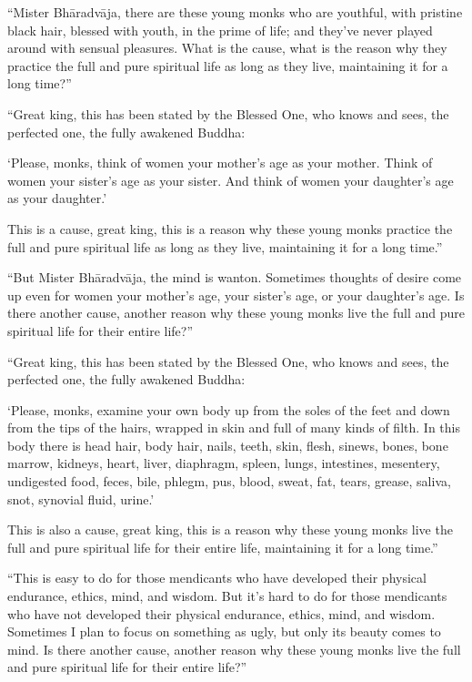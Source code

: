 \documentclass[12pt,openany]{book}%
\begin{document}
“Mister \textsanskrit{Bhāradvāja}, there are these young monks who are youthful, with pristine black hair, blessed with youth, in the prime of life; and they’ve never played around with sensual pleasures. What is the cause, what is the reason why they practice the full and pure spiritual life as long as they live, maintaining it for a long time?” 

“Great king, this has been stated by the Blessed One, who knows and sees, the perfected one, the fully awakened Buddha: 

‘Please, monks, think of women your mother’s age as your mother. Think of women your sister’s age as your sister. And think of women your daughter’s age as your daughter.’ 

This is a cause, great king, this is a reason why these young monks practice the full and pure spiritual life as long as they live, maintaining it for a long time.” 

“But Mister \textsanskrit{Bhāradvāja}, the mind is wanton. Sometimes thoughts of desire come up even for women your mother’s age, your sister’s age, or your daughter’s age. Is there another cause, another reason why these young monks live the full and pure spiritual life for their entire life?” 

“Great king, this has been stated by the Blessed One, who knows and sees, the perfected one, the fully awakened Buddha: 

‘Please, monks, examine your own body up from the soles of the feet and down from the tips of the hairs, wrapped in skin and full of many kinds of filth. In this body there is head hair, body hair, nails, teeth, skin, flesh, sinews, bones, bone marrow, kidneys, heart, liver, diaphragm, spleen, lungs, intestines, mesentery, undigested food, feces, bile, phlegm, pus, blood, sweat, fat, tears, grease, saliva, snot, synovial fluid, urine.’ 

This is also a cause, great king, this is a reason why these young monks live the full and pure spiritual life for their entire life, maintaining it for a long time.” 

“This is easy to do for those mendicants who have developed their physical endurance, ethics, mind, and wisdom. But it’s hard to do for those mendicants who have not developed their physical endurance, ethics, mind, and wisdom. Sometimes I plan to focus on something as ugly, but only its beauty comes to mind. Is there another cause, another reason why these young monks live the full and pure spiritual life for their entire life?” 
\end{document}
